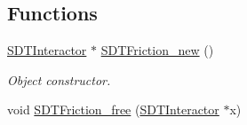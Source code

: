 \subsection*{Functions}
\begin{DoxyCompactItemize}
\item 
\hyperlink{group__interactor_gacd68aba5c96532193d9cbc8dfa8f1c8c}{S\+D\+T\+Interactor} $\ast$ \hyperlink{group__friction_ga19e93c58ce49488d9e14962169b1eb59}{S\+D\+T\+Friction\+\_\+new} ()
\begin{DoxyCompactList}\small\item\em Object constructor. \end{DoxyCompactList}\item 
\hypertarget{group__friction_gadd954f97f0f293cf6091f569cfdf1aa1}{}void \hyperlink{group__friction_gadd954f97f0f293cf6091f569cfdf1aa1}{S\+D\+T\+Friction\+\_\+free} (\hyperlink{group__interactor_gacd68aba5c96532193d9cbc8dfa8f1c8c}{S\+D\+T\+Interactor} $\ast$x)\label{group__friction_gadd954f97f0f293cf6091f569cfdf1aa1}


\end{DoxyCompactItemize}
